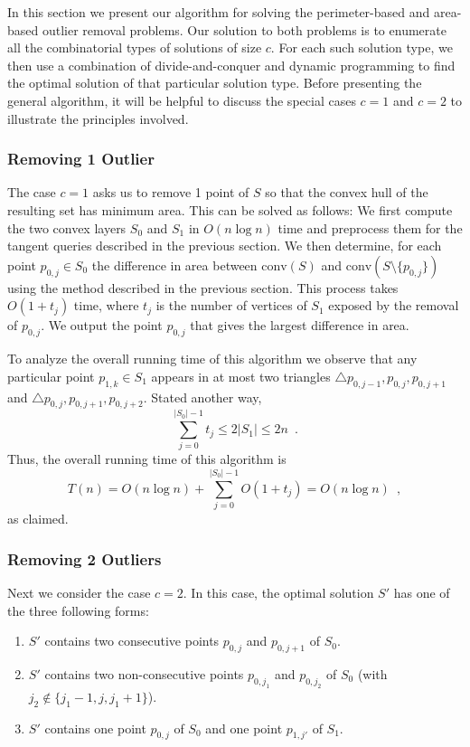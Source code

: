 \documentclass{elsart}
\newcommand{\ch}{\mathrm{conv}}
\begin{document}
In this section we present our algorithm for solving the
perimeter-based and area-based outlier removal problems. Our solution
to both problems is to enumerate all the combinatorial types of
solutions of size $c$.  For each such solution type, we then use a
combination of divide-and-conquer and dynamic programming to find the
optimal solution of that particular solution type.  Before presenting
the general algorithm, it will be helpful to discuss the special cases
$c=1$ and $c=2$ to illustrate the principles involved.

\subsubsection{Removing 1 Outlier}

The case $c=1$ asks us to remove 1 point of $S$ so that the convex
hull of the resulting set has minimum area.  This can be solved as
follows: We first compute the two convex layers $S_0$ and $S_1$ in
$O(n\log n)$ time and preprocess them for the tangent queries
described in the previous section.  We then determine, for each point
$p_{0,j}\in S_0$ the difference in area between $\ch(S)$ and
$\ch(S\setminus\{p_{0,j}\})$ using the method described in the
previous section.  This process takes $O(1+t_j)$ time, where $t_j$ is
the number of vertices of $S_1$ exposed by the removal of $p_{0,j}$.
We output the point $p_{0,j}$ that gives the largest difference in
area.

To analyze the overall running time of this algorithm we observe that
any particular point $p_{1,k}\in S_1$ appears in at most two triangles
$\triangle p_{0,j-1},p_{0,j},p_{0,j+1}$ and
$\triangle p_{0,j},p_{0,j+1},p_{0,j+2}$.  Stated another way,
\[
     \sum_{j=0}^{|S_0|-1} t_j \le 2|S_1|\le 2n \enspace .
\]
Thus, the overall running time of this algorithm is
\[
     T(n) = O(n\log n)+\sum_{j=0}^{|S_0|-1} O(1+t_j) = O(n\log n) \enspace ,
\]
as claimed.

\subsubsection{Removing 2 Outliers}

Next we consider the case $c=2$.  In this case, the optimal solution
$S'$ has one of the three following forms:

\begin{enumerate}

\item $S'$ contains two consecutive points $p_{0,j}$ and $p_{0,j+1}$
of $S_0$.

\item $S'$ contains two non-consecutive points $p_{0,j_1}$ and
$p_{0,j_2}$ of $S_0$ (with $j_2\not\in\{j_1-1,j,j_1+1\}$).

\item $S'$ contains one point $p_{0,j}$ of $S_0$ and one point
$p_{1,j'}$ of $S_1$.

\end{enumerate}
\end{document}
